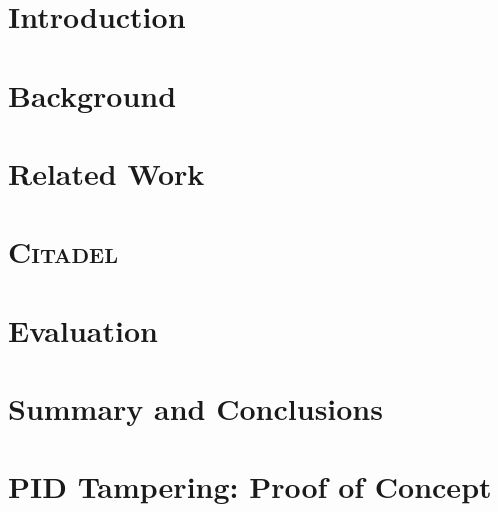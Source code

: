 \documentclass[a4paper,12pt,twoside,openright]{report}
\begin{document}
\pagestyle{empty}
\singlespacing
{}

\restoregeometry
\onehalfspacing

\singlespacing


\setcounter{page}{0}
\pagestyle{plain}
\tableofcontents
{}
\listoffigures
{}
\listoftables

\onehalfspacing

\raggedbottom

\chapter{Introduction}
\setcounter{page}{1} 


\chapter{Background} 
\label{sec:background}


\chapter{Related Work} 
\label{sec:related}


\chapter{\textsc{Citadel}}
\label{sec:design}


\chapter{Evaluation} 
\label{sec:eval}


\chapter{Summary and Conclusions}
\label{sec:conclusion}



\appendix
\singlespacing

\chapter{PID Tampering: Proof of Concept}
\label{appendix:pid-tampering}
\end{document}
